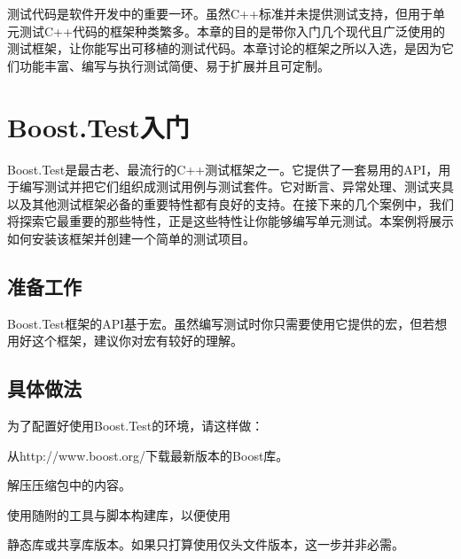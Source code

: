 
测试代码是软件开发中的重要一环。虽然C++标准并未提供测试支持，但用于单元测试C++代码的框架种类繁多。本章的目的是带你入门几个现代且广泛使用的测试框架，让你能写出可移植的测试代码。本章讨论的框架之所以入选，是因为它们功能丰富、编写与执行测试简便、易于扩展并且可定制。



\section{Boost.Test入门}



Boost.Test是最古老、最流行的C++测试框架之一。它提供了一套易用的API，用于编写测试并把它们组织成测试用例与测试套件。它对断言、异常处理、测试夹具以及其他测试框架必备的重要特性都有良好的支持。在接下来的几个案例中，我们将探索它最重要的那些特性，正是这些特性让你能够编写单元测试。本案例将展示如何安装该框架并创建一个简单的测试项目。



\subsection{准备工作}



Boost.Test框架的API基于宏。虽然编写测试时你只需要使用它提供的宏，但若想用好这个框架，建议你对宏有较好的理解。



\subsection{具体做法}



为了配置好使用Boost.Test的环境，请这样做：



从http://\allowbreak{}www.\allowbreak{}boost.\allowbreak{}org/\allowbreak{}下载最新版本的Boost库。



解压压缩包中的内容。



使用随附的工具与脚本构建库，以便使用



静态库或共享库版本。如果只打算使用仅头文件版本，这一步并非必需。



